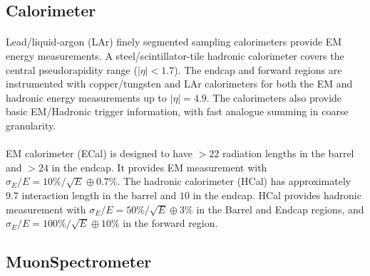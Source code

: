 \subsection{Calorimeter}
\paragraph{}
Lead/liquid-argon (LAr) finely segmented sampling calorimeters provide EM energy measurements. 
A steel/scintillator-tile hadronic calorimeter covers the central pseudorapidity range ($|\eta| < 1.7$).
The endcap and forward regions are instrumented with copper/tungsten and LAr calorimeters for both the EM and hadronic energy measurements up to $|\eta| = 4.9$. The calorimeters also provide basic EM/Hadronic trigger information, with fast analogue summing in coarse granularity.
\paragraph{}
EM calorimeter (ECal) is designed to have $>22$ radiation lengths in the barrel and $> 24$ in the endcap. It provides EM measurement with $\sigma_E/E = 10\%/\sqrt{E} \oplus 0.7\%$. The hadronic calorimeter (HCal) has approximately $9.7$ interaction length in the barrel and $10$ in the endcap. HCal provides hadronic measurement with $\sigma_E/E = 50\%/\sqrt{E} \oplus 3\%$ in the Barrel and Endcap regions, and $\sigma_E/E = 100\%/\sqrt{E} \oplus 10\%$  in the forward region.

\subsection{MuonSpectrometer}

